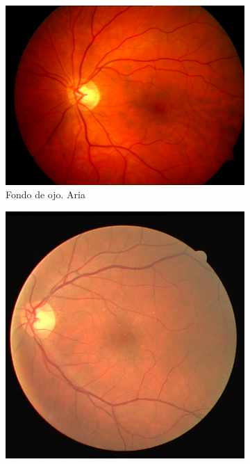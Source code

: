 \begin{figure}[H]
    \centering
    \begin{subfigure}[b]{0.3\textwidth}
				\centering
        \includegraphics[height=\textwidth]{./Figures/imagesARIA}
        \caption{Fondo de ojo. Aria}
        \label{fig:Aria}
    \end{subfigure}
    \begin{subfigure}[b]{0.3\textwidth}
				\centering
        \includegraphics[height=\textwidth]{./Figures/imagesDRIVE}

\end{subfigure}
\end{figure}
